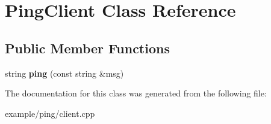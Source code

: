 \hypertarget{classPingClient}{}\section{Ping\+Client Class Reference}
\label{classPingClient}
\subsection*{Public Member Functions}
\begin{DoxyCompactItemize}
\item 
\mbox{\label{classPingClient_a888873d874335defed11102c757e0612}} 
string {\bfseries ping} (const string \&msg)
\end{DoxyCompactItemize}


The documentation for this class was generated from the following file\+:\begin{DoxyCompactItemize}
\item 
example/ping/client.\+cpp\end{DoxyCompactItemize}

